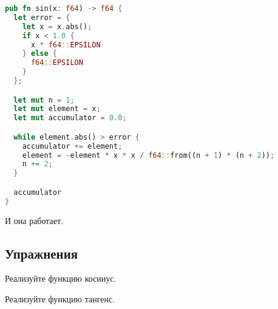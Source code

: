 \begin{lstlisting}[language=Rust]
pub fn sin(x: f64) -> f64 {
  let error = {
    let x = x.abs();
    if x < 1.0 {
      x * f64::EPSILON
    } else {
      f64::EPSILON
    }
  };

  let mut n = 1;
  let mut element = x;
  let mut accumulator = 0.0;

  while element.abs() > error {
    accumulator += element;
    element = -element * x * x / f64::from((n + 1) * (n + 2));
    n += 2;
  }

  accumulator
}
\end{lstlisting}

И она работает.

\subsection{Упражнения}

\begin{Exercise}
  \Question
  Реализуйте функцию косинус.
\end{Exercise}

\begin{Exercise}
  \Question
  Реализуйте функцию тангенс.
\end{Exercise}
